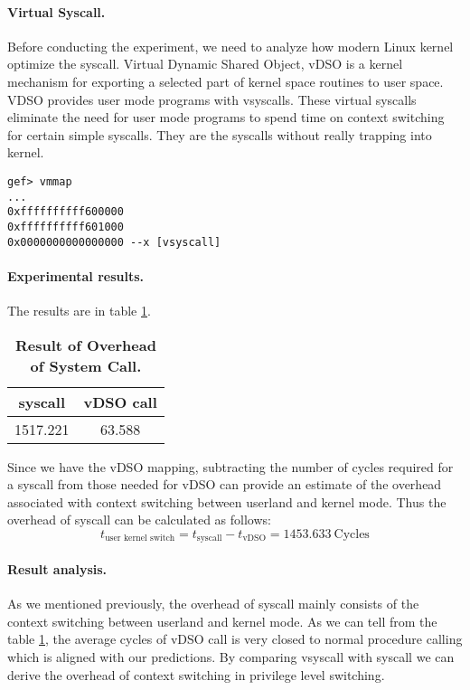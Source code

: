 \paragraph{Virtual Syscall.} Before conducting the experiment, we need to analyze how modern Linux kernel optimize the syscall. Virtual Dynamic Shared Object, vDSO is a kernel mechanism for exporting a selected part of kernel space routines to user space. VDSO provides user mode programs with vsyscalls. These virtual syscalls eliminate the need for user mode programs to spend time on context switching for certain simple syscalls. They are the syscalls without really trapping into kernel.

\begin{lstlisting}[caption=vDSO mapping]
gef> vmmap
...
0xffffffffff600000 
0xffffffffff601000 
0x0000000000000000 --x [vsyscall]
\end{lstlisting}

\paragraph{Experimental results.} The results are in table \ref{table:syscall-test}.
\begin{table}[h]
	\centering
	\begin{tabular}{c|c}
		\hline
		\bf{syscall} & \bf{vDSO call} \\ \hline
        1517.221 & 63.588 \\ \hline
	\end{tabular}
	\caption{\textbf{Result of Overhead of System Call.}}
	\label{table:syscall-test}
\end{table}
Since we have the vDSO mapping, subtracting the number of cycles required for a syscall from those needed for vDSO can provide an estimate of the overhead associated with context switching between userland and kernel mode. Thus the overhead of syscall can be calculated as follows:
\begin{equation}
    t_{\text{user\ kernel\ switch}}=t_{\text{syscall}}-t_{\text{vDSO}}=1453.633\ \text{Cycles}
\end{equation}

\paragraph{Result analysis.} As we mentioned previously, the overhead of syscall mainly consists of the context switching between userland and kernel mode. As we can tell from the table \ref{table:syscall-test}, the average cycles of vDSO call is very closed to normal procedure calling which is aligned with our predictions. By comparing vsyscall with syscall we can derive the overhead of context switching in privilege level switching.

